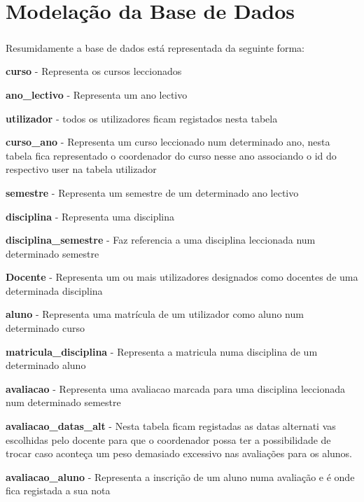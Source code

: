 \chapter{Modelação da Base de Dados}

\paragraph{}

Resumidamente a base de dados está representada da seguinte forma:

\begin{list}{\textbf{-}}{\textbf{TABELAS}}
\item \textbf{curso} - Representa os cursos leccionados
\item \textbf{ano\_lectivo} - Representa um ano lectivo
\item \textbf{utilizador} - todos os utilizadores ficam registados nesta tabela
\item \textbf{curso\_ano} - Representa um curso leccionado num determinado ano, nesta tabela fica representado o coordenador do curso nesse ano associando o id do respectivo user na tabela utilizador
\item \textbf{semestre} - Representa um semestre de um determinado ano lectivo
\item \textbf{disciplina} - Representa uma disciplina
\item \textbf{disciplina\_semestre} - Faz referencia a uma disciplina leccionada num determinado semestre
\item \textbf{Docente} - Representa um ou mais utilizadores designados como docentes de uma determinada disciplina
\item \textbf{aluno} - Representa uma matrícula de um utilizador como aluno num determinado curso
\item \textbf{matricula\_disciplina} - Representa a matricula numa disciplina de um determinado aluno
\item \textbf{avaliacao} - Representa uma avaliacao marcada para uma disciplina leccionada num determinado semestre
\item \textbf{avaliacao\_datas\_alt} - Nesta tabela ficam registadas as datas alternati vas escolhidas pelo docente para que o coordenador possa ter a possibilidade de trocar caso aconteça um peso demasiado excessivo nas avaliações para os alunos.
\item \textbf{avaliacao\_aluno} - Representa a inscrição de um aluno numa avaliação e é onde fica registada a sua nota
\end{list}

